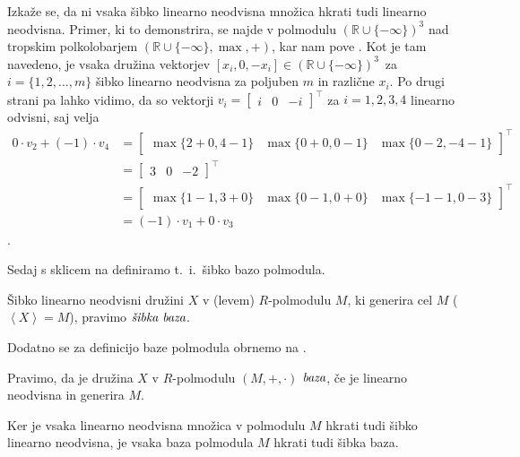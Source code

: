 \documentclass[mat1]{fmfdelo}
\newcommand{\R}{\mathbb{R}}
\newcommand{\pojem}[1]{\ensuremath{\emph{#1}}}
\newcommand{\Gen}[1]{\ensuremath{\left<{#1}\right>}}
\begin{document}
Izkaže se, da ni vsaka šibko linearno neodvisna množica hkrati tudi linearno neodvisna. Primer, ki to demonstrira, se najde v polmodulu $(\R\cup\{-\infty\})^3$ nad tropskim polkolobarjem $(\R\cup\{-\infty\}, \max, +)$, kar nam pove \cite[zgled 2.\ 14.]{bib:AkianTropSemi}. Kot je tam navedeno, je vsaka družina vektorjev $[x_i, 0, -x_i]\in (\R\cup\{-\infty\})^3$~za $i = \{1, 2, \ldots, m\}$ šibko linearno neodvisna za poljuben $m$ in različne $x_i$. Po drugi strani pa lahko vidimo, da so vektorji $v_i = \begin{bmatrix}i & 0 & -i\end{bmatrix}^\top$ za $i = 1, 2, 3, 4$ linearno odvisni, saj velja \begin{align*}0\cdot v_2 + (-1)\cdot v_4 &= \begin{bmatrix}\max\{2+0,4-1\} &\max\{0+0,0-1\}&\max\{0-2, -4-1\} \end{bmatrix}^\top \\ &= \begin{bmatrix}3 & 0 & -2\end{bmatrix}^\top\\ &= \begin{bmatrix}\max\{1-1, 3+0\}&\max\{0-1, 0+0\}&\max\{-1-1, 0-3\}\end{bmatrix}^\top \\ &= (-1)\cdot v_1 + 0\cdot v_3\end{align*}.

Sedaj s sklicem na \cite[Definicija 2.~4.]{bib:Tanbase} definiramo t.~i.~šibko bazo polmodula.

\begin{definicija}\label{def:polmodbaza}
	Šibko linearno neodvisni družini $X$ v (levem) $R$-polmodulu $M$, ki generira cel $M$ ($\Gen{X} = M$), pravimo \pojem{šibka baza}.
\end{definicija}

Dodatno se za definicijo baze polmodula obrnemo na \cite[poglavje 5, definicija 2.\ 5.\ 2.]{bib:Gondran}.

\begin{definicija}
	Pravimo, da je družina $X$ v $R$-polmodulu $(M, +, \cdot)$ \pojem{baza}, če je linearno neodvisna in generira $M$.
\end{definicija}

\begin{opomba}
Ker je vsaka linearno neodvisna množica v polmodulu $M$ hkrati tudi šibko linearno neodvisna, je vsaka baza polmodula $M$ hkrati tudi šibka baza.
\end{opomba}
\end{document}
